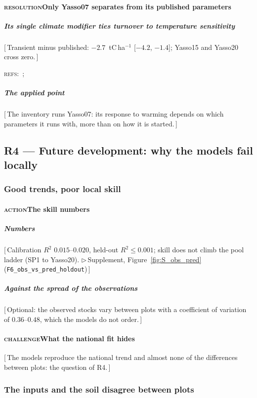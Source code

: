 \documentclass[11pt]{article}
\newcounter{subsubparagraph}[subparagraph]
\newcommand{\beat}[1]{\textcolor{black!45}{\textsc{\small #1}}\enspace}
\newcommand{\gap}[1]{\textcolor{red!70!black}{\small[\,#1\,]}}
\newcommand{\refs}[1]{\par\textcolor{red!70!black}{\footnotesize\textsc{refs:}\ #1}\par}
\newcommand{\suppanchor}[2]{\textcolor{red!70!black}{\small$\triangleright$\,Supplement,
  Figure~\ref{fig:#1} (\texttt{#2})}}
\begin{document}
\paragraph{\beat{resolution}Only Yasso07 separates from its published parameters}
\subparagraph{Its single climate modifier ties turnover to temperature sensitivity}
\gap{Transient minus published: $-2.7$~tC\,ha$^{-1}$ [$-4.2$, $-1.4$]; Yasso15 and Yasso20 cross
zero.}
\refs{\citet{Tuomi2009}; \citet{Viskari2022}}
\subparagraph{The applied point}
\gap{The inventory runs Yasso07: its response to warming depends on which parameters it runs
with, more than on how it is started.}

\subsection{R4 --- Future development: why the models fail locally}\label{sec:r4}

\subsubsection{Good trends, poor local skill}
\paragraph{\beat{action}The skill numbers}
\subparagraph{Numbers}
\gap{Calibration $R^2$ $0.015$--$0.020$, held-out $R^2 \le 0.001$; skill does not climb the pool
ladder (SP1 to Yasso20). \suppanchor{S_obs_pred}{F6\_obs\_vs\_pred\_holdout}}
\subparagraph{Against the spread of the observations}
\gap{Optional: the observed stocks vary between plots with a coefficient of variation of
$0.36$--$0.48$, which the models do not order.}
\paragraph{\beat{challenge}What the national fit hides}
\gap{The models reproduce the national trend and almost none of the differences between plots:
the question of R4.}

\subsubsection{The inputs and the soil disagree between plots}
\end{document}
